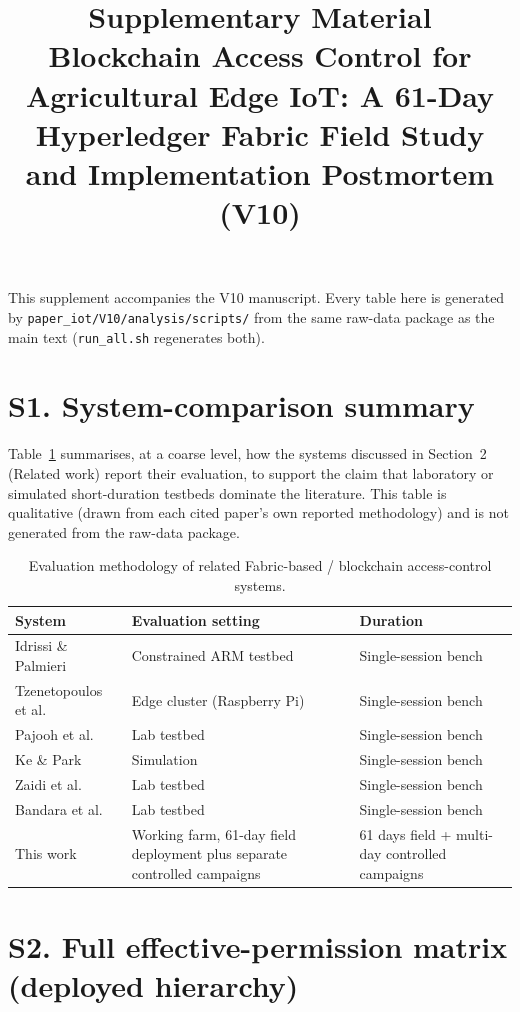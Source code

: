 \documentclass[11pt]{article}
\title{Supplementary Material\\[4pt]\large Blockchain Access Control for Agricultural Edge IoT: A 61-Day Hyperledger Fabric Field Study and Implementation Postmortem (V10)}
\author{}
\date{}
\begin{document}
\maketitle

This supplement accompanies the V10 manuscript. Every table here is generated by \texttt{paper\_iot/V10/analysis/scripts/} from the same raw-data package as the main text (\texttt{run\_all.sh} regenerates both).

\section*{S1. System-comparison summary}

Table~\ref{tab:s1} summarises, at a coarse level, how the systems discussed in Section~2 (Related work) report their evaluation, to support the claim that laboratory or simulated short-duration testbeds dominate the literature. This table is qualitative (drawn from each cited paper's own reported methodology) and is not generated from the raw-data package.

\begin{table}[h]
\centering
\caption{Evaluation methodology of related Fabric-based / blockchain access-control systems.}
\label{tab:s1}
\small
\begin{tabular}{p{3.4cm}p{5.0cm}p{4.0cm}}
\toprule
System & Evaluation setting & Duration \\
\midrule
Idrissi \& Palmieri~\citep{idrissi2024blockchain} & Constrained ARM testbed & Single-session bench \\
Tzenetopoulos et al.~\citep{tzenetopoulos2022hlfkubed} & Edge cluster (Raspberry Pi) & Single-session bench \\
Pajooh et al.~\citep{pajooh2021hyperledger} & Lab testbed & Single-session bench \\
Ke \& Park~\citep{ke2023performance} & Simulation & Single-session bench \\
Zaidi et al.~\citep{zaidi2023fabrication} & Lab testbed & Single-session bench \\
Bandara et al.~\citep{bandara2021fabric} & Lab testbed & Single-session bench \\
This work & Working farm, 61-day field deployment plus separate controlled campaigns & 61 days field + multi-day controlled campaigns \\
\bottomrule
\end{tabular}
\end{table}

\section*{S2. Full effective-permission matrix (deployed hierarchy)}
\end{document}
